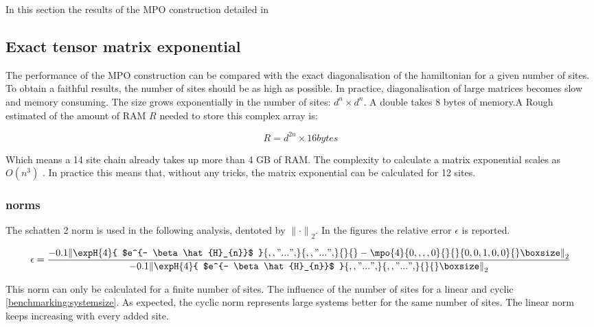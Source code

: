 In this section the results of the MPO construction detailed in

\subsection{Exact tensor matrix exponential } \label{chap_bench}

The performance of the MPO construction can be compared with the exact diagonalisation of the hamiltonian for a given number of sites. To obtain a faithful results, the number of sites should be as high as possible. In practice, diagonalisation of large matrices becomes slow and memory consuming. The size grows exponentially in the number of sites: $d^{n} \times d^{n} $. A double takes 8 bytes of memory.A Rough estimated of the amount of RAM $R$ needed to store this complex array is:

\begin{equation}
    R = d^{2 n} \times 16 bytes
\end{equation}

Which means a 14 site chain already takes up more than 4 GB of RAM. The complexity to calculate a matrix exponential scales as $O(n^3)$ \cite{Moler2003}. In practice this means that, without any tricks, the matrix exponential can be calculated for 12 sites.

\subsubsection{norms} \label{mponormdef}
\def \expHBlock {\expH{4}{ $e^{- \beta \hat{H}_{n}}$   }{ {,,"...",} }{ {,,"...",} }{}{} }
\def \Mn {\mpo{4}{ {0,,,,0}  }{}{}{{0,0,1,0,0}}{}}

The schatten 2 norm is used in the following analysis, dentoted by ${\| \cdot \|} _{2}$. In the figures the relative error $\epsilon$ is reported.

\begin{equation}
    \epsilon = \frac{  {  \left \|  \expHBlock - \Mn  \right \|} _{2}  }{ {  \left\|  \expHBlock \right \|}_2}
\end{equation}

This norm can only be calculated for a finite number of sites. The influence of the number of sites for a linear  and cyclic \cref{benchmarking:systemsize}. As expected, the cyclic norm represents large systems better for the same number of sites. The linear norm keeps increasing with every added site.

